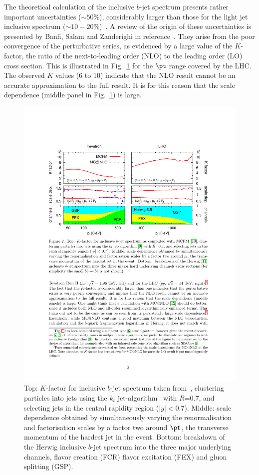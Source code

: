 The theoretical calculation of the inclusive $b$-jet spectrum presents rather important uncertainties ($\sim 50\%$), considerably larger than those for the light jet inclusive spectrum ($\sim 10-20\%$)~\cite{Frixione:1996nh}. 
A review of the origin of these uncertainties is presented by Banfi, Salam and Zanderighi in reference~\cite{Salam.AccurateHQ}.  They arise from the poor convergence of the perturbative series, as evidenced by a large value of the $K$-factor, the ratio of the next-to-leading order (NLO) to the leading order (LO) cross section. %
This is illustrated in Fig.~\ref{fig:bjets_qcd} for the $\pt$ range covered by the LHC.   The observed $K$ values (6 to 10) indicate that the NLO result cannot be an accurate approximation to the full result. It is for this reason that the scale dependence (middle panel in Fig.~\ref{fig:bjets_qcd}) is large. 

\begin{figure}[tp]
\centering
\includegraphics[height=0.7\textwidth,viewport=300 410 530 690,clip]{FIGS/bjets_qcd.pdf}
  \caption{Top: $K$-factor for inclusive $b$-jet spectrum taken from~\cite{Salam.AccurateHQ}, clustering particles into jets using the $k_t$   jet-algorithm~\cite{kt1}  with $R$=0.7, and selecting jets in the central rapidity region ($|y| <0.7$). Middle: scale dependence obtained by simultaneously varying the renormalisation and factorisation scales by a factor two around $\pt$, the transverse momentum of the hardest jet in the event. Bottom: breakdown of the Herwig \cite{Herwig} inclusive $b$-jet spectrum into the three major underlying channels, flavor creation (FCR) flavor excitation (FEX) and gluon splitting (GSP).}
  \label{fig:bjets_qcd}
\end{figure}

